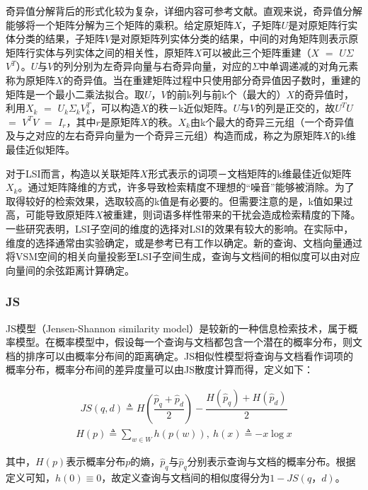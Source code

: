 奇异值分解背后的形式化较为复杂，详细内容可参考文献\cite{salton1986introduction}。直观来说，奇异值分解能够将一个矩阵分解为三个矩阵的乘积。给定原矩阵$X$，子矩阵$U$是对原矩阵行实体分类的结果，子矩阵$V$是对原矩阵列实体分类的结果，中间的对角矩阵则表示原矩阵行实体与列实体之间的相关性，原矩阵$X$可以被此三个矩阵重建（$X$ $=$ $U$$\Sigma$$V^T$）。$U$与$V$的列分别为左奇异向量与右奇异向量，对应的$\Sigma$中单调递减的对角元素称为原矩阵$X$的奇异值。当在重建矩阵过程中只使用部分奇异值因子数时，重建的矩阵是一个最小二乘法拟合。取$U$，$V$的前k列与前k个（最大的）$X$的奇异值时，利用$X_{k}$ $=$ $U_{k}$$\Sigma_{k}$$V_{k}^T$，可以构造$X$的秩－k近似矩阵。$U$与$V$的列是正交的，故$U^TU$ $=$ $V^TV$ $=$ $I_{r}$，其中$r$是原矩阵$X$的秩。$X_{k}$由k个最大的奇异三元组（一个奇异值及与之对应的左右奇异向量为一个奇异三元组）构造而成，称之为原矩阵$X$的k维最佳近似矩阵。

对于LSI而言，构造以关联矩阵$X$形式表示的词项－文档矩阵的k维最佳近似矩阵$X_{k}$。通过矩阵降维的方式，许多导致检索精度不理想的“噪音”能够被消除。为了取得较好的检索效果，选取较高的k值是有必要的。但需要注意的是，k值如果过高，可能导致原矩阵$X$被重建，则词语多样性带来的干扰会造成检索精度的下降。一些研究表明，LSI子空间的维度的选择对LSI的效果有较大的影响\cite{deerwester1990indexing,dumais1991improving,dumais1994latent}。在实际中，维度的选择通常由实验确定，或是参考已有工作以确定。新的查询、文档向量通过将VSM空间的相关向量投影至LSI子空间生成，查询与文档间的相似度可以由对应向量间的余弦距离计算确定。

\subsubsection{JS}
JS模型（Jensen-Shannon similarity model）是较新的一种信息检索技术，属于概率模型。在概率模型中，假设每一个查询与文档都包含一个潜在的概率分布，则文档的排序可以由概率分布间的距离确定。JS相似性模型将查询与文档看作词项的概率分布，概率分布间的差异度量可以由JS散度计算\cite{cover2012elements}而得，定义如下：

\begin{align}
 JS(q,d) \triangleq H(\dfrac {\hat {p}_{q}+\hat {p}_{d}} {2}) - \dfrac {H(\hat {p}_{q})+H(\hat {p}_{d})} {2}
  \end{align}
  \begin{align}
 H(p) \triangleq \sum _{w\in W}h(p(w)),\ h(x) \triangleq -x\log x
  \end{align}

其中，$H(p)$表示概率分布$p$的熵，$\hat {p}_{q}$与$\hat {p}_{q}$分别表示查询与文档的概率分布。根据定义可知，$h(0) \equiv 0$，故定义查询与文档间的相似度得分为$1 - JS(q，d)$。

